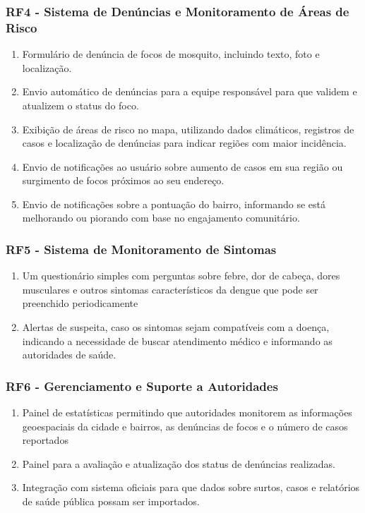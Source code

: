 \documentclass[a5paper, 12pt]{article}
\begin{document}
    \subsubsection{RF4 - Sistema de Denúncias e Monitoramento de Áreas de Risco}
    \begin{enumerate}
        \item Formulário de denúncia de focos de mosquito, incluindo texto, foto e localização.
        \item Envio automático de denúncias para a equipe responsável para que validem e atualizem o status do foco. 
        \item Exibição de áreas de risco no mapa, utilizando dados climáticos, registros de casos e localização de denúncias para indicar regiões com maior incidência.
        \item Envio de notificações ao usuário sobre aumento de casos em sua região ou surgimento de focos próximos ao seu endereço.
        \item Envio de notificações sobre a pontuação do bairro, informando se está melhorando ou piorando com base no engajamento comunitário.
    \end{enumerate}
    
    \subsubsection{RF5 - Sistema de Monitoramento de Sintomas}
    \begin{enumerate}
        \item Um questionário simples com perguntas sobre febre, dor de cabeça, dores musculares e outros sintomas característicos da dengue que pode ser preenchido periodicamente
        \item Alertas de suspeita, caso os sintomas sejam compatíveis com a doença, indicando a necessidade de buscar atendimento médico e informando as autoridades de saúde.
    \end{enumerate}
    \subsubsection{RF6 - Gerenciamento e Suporte a Autoridades}
    \begin{enumerate}
        \item Painel de estatísticas permitindo que autoridades monitorem as informações geoespaciais da cidade e bairros, as denúncias de focos e o número de casos  reportados
        \item Painel para a avaliação e atualização dos status de denúncias realizadas.
        \item Integração com sistema oficiais para que dados sobre surtos, casos e relatórios de saúde pública possam ser importados.
    \end{enumerate}
\end{document}
